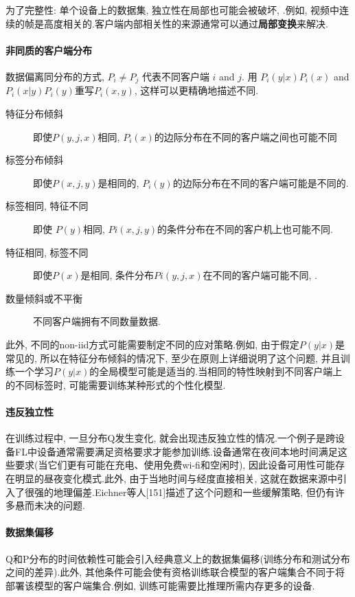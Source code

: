 \documentclass[a4paper]{article}
\theoremstyle{definition}
\numberwithin{equation}{section}
\begin{document}
为了完整性: 单个设备上的数据集,  独立性在局部也可能会被破坏, .例如, 视频中连续的帧是高度相关的.客户端内部相关性的来源通常可以通过\textbf{局部变换}来解决.

\paragraph{非同质的客户端分布}
数据偏离同分布的方式\citep{hsieh2019non},     $P_i \neq P_j$ 代表不同客户端 $i$ and $j$. 用 $P_i(y | x) P_i(x)$ and $P_i(x | y) P_i(y) $重写$P_i(x,  y)$, 这样可以更精确地描述不同.
\begin{description}
\item[特征分布倾斜] 即使$P(y, j, x)$相同,  $P_i(x)$的边际分布在不同的客户端之间也可能不同
\item[标签分布倾斜] 即使$P(x,  j,  y)$是相同的, $P_i(y)$的边际分布在不同的客户端可能是不同的.
\item[标签相同, 特征不同] 即使 $P(y)$相同,  $Pi(x, j, y)$的条件分布在不同的客户机上也可能不同. 
\item[特征相同, 标签不同] 即使$P(x)$是相同,  条件分布$Pi(y, j, x)$在不同的客户端可能不同, .
\item[数量倾斜或不平衡]不同客户端拥有不同数量数据. 
\end{description}

此外, 不同的non-iid方式可能需要制定不同的应对策略.例如, 由于假定$P(y | x)$是常见的, 所以在特征分布倾斜的情况下, 至少在原则上详细说明了这个问题, 并且训练一个学习$P(y | x)$的全局模型可能是适当的.当相同的特性映射到不同客户端上的不同标签时, 可能需要训练某种形式的个性化模型.

\paragraph{违反独立性}
在训练过程中, 一旦分布Q发生变化, 就会出现违反独立性的情况.一个例子是跨设备FL中设备通常需要满足资格要求才能参加训练.设备通常在夜间本地时间满足这些要求(当它们更有可能在充电、使用免费wi-fi和空闲时), 因此设备可用性可能存在明显的昼夜变化模式.此外, 由于当地时间与经度直接相关, 这就在数据来源中引入了很强的地理偏差.Eichner等人[151]描述了这个问题和一些缓解策略, 但仍有许多悬而未决的问题.

\paragraph{数据集偏移}
Q和P分布的时间依赖性可能会引入经典意义上的数据集偏移(训练分布和测试分布之间的差异).此外, 其他条件可能会使有资格训练联合模型的客户端集合不同于将部署该模型的客户端集合.例如, 训练可能需要比推理所需内存更多的设备. 
\end{document}

